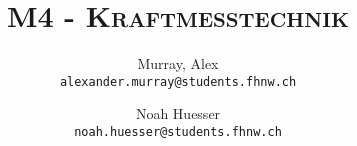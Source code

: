 \author{%
    Murray, Alex\\
    \texttt{alexander.murray@students.fhnw.ch}
    \and
    Noah Huesser\\
    \texttt{noah.huesser@students.fhnw.ch}
}

\title{
    \vspace{20mm}
    \Huge{\textsc{M4 - Kraftmesstechnik}}
}
